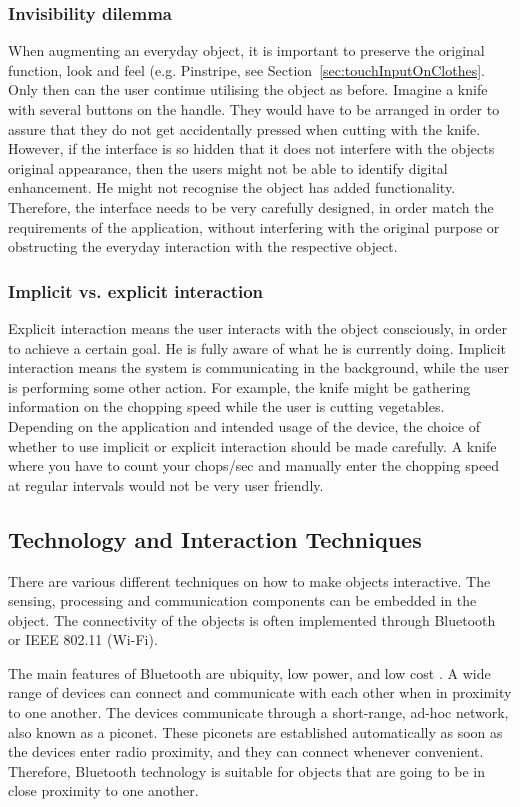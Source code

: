 \subsubsection{Invisibility dilemma}
When augmenting an everyday object, it is important to preserve the original function, look and feel (e.g. Pinstripe, see Section~\ref{sec:touchInputOnClothes}.
Only then can the user continue utilising the object as before. Imagine a knife with several buttons on the handle. They would have to be arranged in order to assure that they do not get accidentally pressed when cutting with the knife.
However, if the interface is so hidden that it does not interfere with the objects original appearance, then the users might not be able to identify digital enhancement.
He might not recognise the object has added functionality.
Therefore, the interface needs to be very carefully designed, in order match the requirements of the application, without interfering with the original purpose or obstructing the everyday interaction with the respective object.

\subsubsection{Implicit vs. explicit interaction}
Explicit interaction means the user interacts with the object consciously, in order to achieve a certain goal.
He is fully aware of what he is currently doing.
Implicit interaction means the system is communicating in the background, while the user is performing some other action.
For example, the knife might be gathering information on the chopping speed while the user is cutting vegetables. Depending on the application and intended usage of the device, the choice of whether to use implicit or explicit interaction should be made carefully.
A knife where you have to count your chops/sec and manually enter the chopping speed at regular intervals would not be very user friendly.

\subsection{Technology and Interaction Techniques}
\label{sec:techniques}
There are various different techniques on how to make objects interactive. 
The sensing, processing and communication components can be embedded in the object.
The connectivity of the objects is often implemented through Bluetooth \cite{bluetoothPatent} or IEEE 802.11 (Wi-Fi).

The main features of Bluetooth are ubiquity, low power, and low cost \cite{btbasics}.
A wide range of devices can connect and communicate with each other when in proximity to one another.
The devices communicate through a short-range, ad-hoc network, also known as a piconet.
These piconets are established automatically as soon as the devices enter radio proximity, and they can connect whenever convenient.
Therefore, Bluetooth technology is suitable for objects that are going to be in close proximity to one another. 

